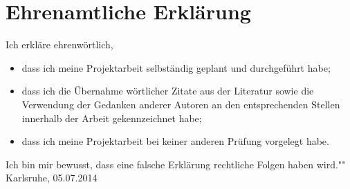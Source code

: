 \section{Ehrenamtliche Erklärung}

Ich erkläre ehrenwörtlich,
\begin{itemize}
    \item dass ich meine Projektarbeit selbständig geplant und durchgeführt habe;
    \item dass ich die Übernahme wörtlicher Zitate aus der Literatur sowie die Verwendung der Gedanken anderer Autoren an den entsprechenden Stellen innerhalb der Arbeit gekennzeichnet habe;
    \item dass ich meine Projektarbeit bei keiner anderen Prüfung
    vorgelegt habe.
\end{itemize}
Ich bin mir bewusst, dass eine falsche Erklärung rechtliche Folgen haben wird."" \\

\vspace{1cm}
Karlsruhe, 05.07.2014 